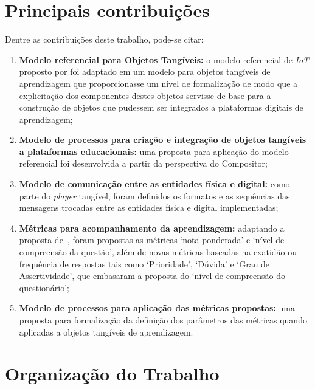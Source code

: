 \section{Principais contribuições}

Dentre as contribuições deste trabalho, pode-se citar:

\begin{enumerate}
	\item \textbf{Modelo referencial para Objetos Tangíveis:} o modelo referencial de \textit{IoT} proposto por \cite{serbanati:2011} foi adaptado em um modelo para objetos tangíveis de aprendizagem que proporcionasse um nível de formalização de modo que a explicitação dos componentes destes objetos servisse de base para a construção de objetos que pudessem ser integrados a plataformas digitais de aprendizagem;
	\item \textbf{Modelo de processos para criação e integração de objetos tangíveis a plataformas educacionais:} uma proposta para aplicação do modelo referencial foi desenvolvida a partir da perspectiva do Compositor;
	\item \textbf{Modelo de comunicação entre as entidades física e digital:} como parte do \textit{player} tangível, foram definidos os formatos e as sequências das mensagens trocadas entre as entidades física e digital implementadas;
	\item \textbf{Métricas para acompanhamento da aprendizagem:} adaptando a proposta de~\cite{Biswas:2007}, foram propostas as métricas `nota ponderada' e `nível de compreensão da questão', além de novas métricas baseadas na exatidão ou frequência de respostas tais como `Prioridade', `Dúvida' e `Grau de Assertividade', que embasaram a proposta do `nível de compreensão do questionário';
	\item \textbf{Modelo de processos para aplicação das métricas propostas:} uma proposta para formalização da definição dos parâmetros das métricas quando aplicadas a objetos tangíveis de aprendizagem.
\end{enumerate}

\section{Organização do Trabalho}
\label{section:outline}

